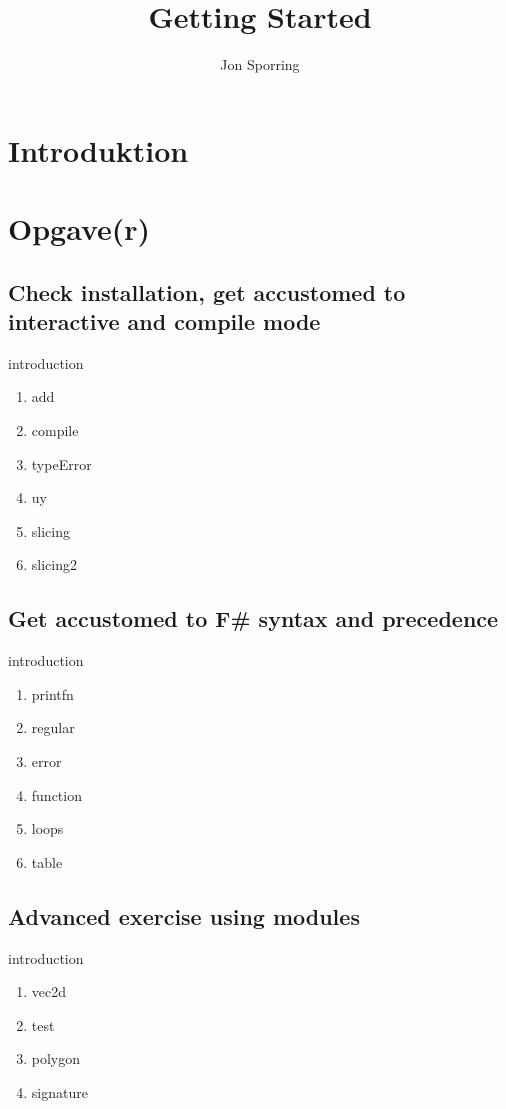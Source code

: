 \documentclass[a4paper,12pt]{article}
\title{Getting Started}
\author{Jon Sporring}
\begin{document}
\maketitle

% 
\section{Introduktion}

\section{Opgave(r)}
\subsection{Check installation, get accustomed to interactive and compile mode}
{introduction}
\begin{enumerate}
\item {add}
\item {compile}
\item {typeError}
\item {uy}
\item {slicing}
\item {slicing2}
\end{enumerate}
\subsection{Get accustomed to F\# syntax and precedence}
{introduction}
\begin{enumerate}
\item {printfn}
\item {regular}
\item {error}
\item {function}
\item {loops}
\item {table}
\end{enumerate}
\subsection{Advanced exercise using modules}
{introduction}
\begin{enumerate}
\item {vec2d}
\item {test}
\item {polygon}
\item {signature}
\end{enumerate}
\end{document}
